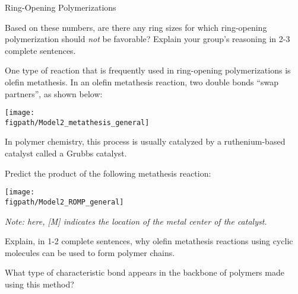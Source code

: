 \begin{activity}{Ring-Opening Polymerizations}
\begin{infobox}
\end{infobox}

\begin{ctqs}

	\question Based on these numbers, are there any ring sizes for which ring-opening polymerization should \emph{not} be favorable?  Explain your group's reasoning in 2-3 complete sentences.
			
				\begin{solution}[2in]
				\end{solution}

\end{ctqs}

\clearpage
\begin{model}
	\label{\labelbase:mdl:ROMP}

	One type of reaction that is frequently used in ring-opening polymerizations is olefin metathesis.
	In an olefin metathesis reaction, two double bonds ``swap partners'', as shown below:
	
	\centerline{\texttt{[image: \\figpath/Model2\_metathesis\_general]}}
	
	In polymer chemistry, this process is usually catalyzed by a ruthenium-based catalyst called a Grubbs catalyst.
	
\end{model}

\begin{ctqs}
	
	\question Predict the product of the following metathesis reaction: \label{\labelbase:ctq:metathesis1}
	
		\texttt{[image: \\figpath/Model2\_ROMP\_general]}
		
		\emph{Note: here, [M] indicates the location of the metal center of the catalyst.}
		
	\question Explain, in 1-2 complete sentences, why olefin metathesis reactions using cyclic molecules can be used to form polymer chains.
			
				\begin{solution}[1.5in]
				\end{solution}
	
	
	\question What type of characteristic bond appears in the backbone of polymers made using this method?
			

\end{ctqs}
\end{activity}
